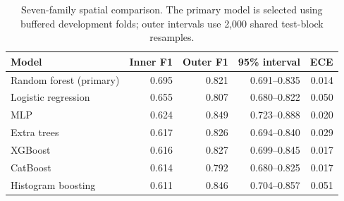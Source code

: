 \begin{table}[tbp]\centering\small
\caption{Seven-family spatial comparison. The primary model is selected using buffered development folds; outer intervals use 2,000 shared test-block resamples.}\label{tab:models}
\begin{tabular}{p{.35\linewidth}rrrr}\toprule
Model & Inner F1 & Outer F1 & 95\% interval & ECE \\\midrule
Random forest (primary) & 0.695 & 0.821 & 0.691--0.835 & 0.014 \\
Logistic regression & 0.655 & 0.807 & 0.680--0.822 & 0.050 \\
MLP & 0.624 & 0.849 & 0.723--0.888 & 0.020 \\
Extra trees & 0.617 & 0.826 & 0.694--0.840 & 0.029 \\
XGBoost & 0.616 & 0.827 & 0.699--0.845 & 0.017 \\
CatBoost & 0.614 & 0.792 & 0.680--0.825 & 0.017 \\
Histogram boosting & 0.611 & 0.846 & 0.704--0.857 & 0.051 \\
\bottomrule\end{tabular}
\end{table}
